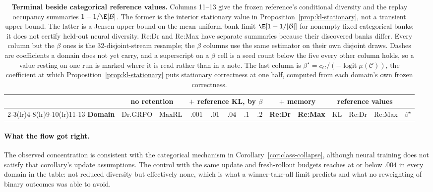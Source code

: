 \begin{table}[t]
  \centering
  \caption{\textbf{Terminal \pmd{} beside categorical reference values.}
  Columns 11--13 give the frozen reference's conditional diversity and
  the replay occupancy summaries $1-1/\E|\mathcal B|$.
  The former is the interior stationary value in
  Proposition~\ref{prop:kl-stationary}, not a transient upper bound.
  The latter is a Jensen upper bound on the mean uniform-bank limit
  $\E[1-1/|\mathcal B|]$ for nonempty fixed categorical banks; it does not
  certify held-out neural diversity. Re:Dr and Re:Max have separate summaries
  because their discovered banks differ. Every
  column but the $\beta$ ones is the 32-disjoint-stream resample; the $\beta$
  columns use the same estimator on their own disjoint draws. Dashes are
  coefficients a domain does not yet carry, and a superscript on a $\beta$ cell
  is a seed count below the five every other column holds, so a value resting
  on one run is marked where it is read rather than in a note. The last column
  is $\beta^\star=c_G/(-\operatorname{logit}\mu(\mathcal C))$, the coefficient
  at which Proposition~\ref{prop:kl-stationary} puts stationary correctness at
  one half, computed from each domain's own frozen correctness.}
  \label{tab:reference-kl-measured}
  \scriptsize
  \setlength{\tabcolsep}{2.9pt}
  \begin{tabular}{@{}lrrrrrrrrrrrrr@{}}
    \toprule
    & \multicolumn{2}{c}{\textbf{no retention}}
      & \multicolumn{5}{c}{\textbf{$+$ reference KL, by $\beta$}}
      & \multicolumn{2}{c}{\textbf{$+$ memory}}
      & \multicolumn{3}{c}{\textbf{reference values}} & \\
    \cmidrule(lr){2-3}\cmidrule(lr){4-8}\cmidrule(lr){9-10}\cmidrule(lr){11-13}
    \textbf{Domain} & Dr.GRPO & MaxRL
      & $.001$ & $.01$ & $.04$ & $.1$ & $.2$
      & \textbf{Re:Dr} & \textbf{Re:Max}
      & KL & Re:Dr & Re:Max & $\beta^\star$ \\
    \midrule
    
  \end{tabular}
\end{table}
\paragraph{What the flow got right.}
The observed concentration is consistent with the categorical mechanism
in Corollary~\ref{cor:class-collapse}, although neural training does not
satisfy that corollary's update assumptions. The
control with the same update and fresh-rollout budgets reaches \pmd{} at or below $.004$ in every domain in
the table: not reduced diversity but effectively none, which is what a
winner-take-all limit predicts and what no reweighting of binary outcomes was
able to avoid.

